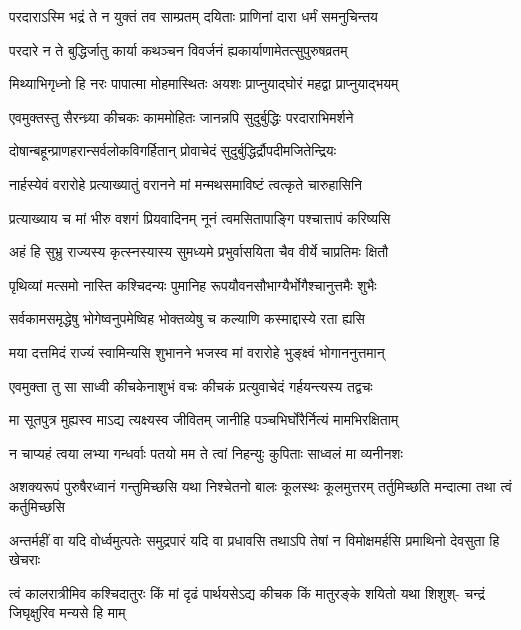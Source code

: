 \twolineshloka
{परदाराऽस्मि भद्रं ते न युक्तं तव साम्प्रतम्}
{दयिताः प्राणिनां दारा धर्मं समनुचिन्तय}


\twolineshloka
{परदारे न ते बुद्धिर्जातु कार्या कथञ्चन}
{विवर्जनं ह्यकार्याणामेतत्सुपुरुषव्रतम्}


\twolineshloka
{मिथ्याभिगृध्नो हि नरः पापात्मा मोहमास्थितः}
{अयशः प्राप्नुयाद्घोरं महद्वा प्राप्नुयाद्भयम्}



\twolineshloka
{एवमुक्तस्तु सैरन्ध्र्या कीचकः काममोहितः}
{जानन्नपि सुदुर्बुद्धिः परदाराभिमर्शने}


\twolineshloka
{दोषान्बहून्प्राणहरान्सर्वलोकविगर्हितान्}
{प्रोवाचेदं सुदुर्बुद्धिर्द्रौपदीमजितेन्द्रियः}


\twolineshloka
{नार्हस्येवं वरारोहे प्रत्याख्यातुं वरानने}
{मां मन्मथसमाविष्टं त्वत्कृते चारुहासिनि}


\twolineshloka
{प्रत्याख्याय च मां भीरु वशगं प्रियवादिनम्}
{नूनं त्वमसितापाङ्गि पश्चात्तापं करिष्यसि}


\twolineshloka
{अहं हि सुभ्रु राज्यस्य कृत्स्नस्यास्य सुमध्यमे}
{प्रभुर्वासयिता चैव वीर्ये चाप्रतिमः क्षितौ}


\twolineshloka
{पृथिव्यां मत्समो नास्ति कश्चिदन्यः पुमानिह}
{रूपयौवनसौभाग्यैर्भोगैश्चानुत्तमैः शुभैः}


\twolineshloka
{सर्वकामसमृद्धेषु भोगेष्वनुपमेष्विह}
{भोक्तव्येषु च कल्याणि कस्माद्दास्ये रता ह्यसि}


\twolineshloka
{मया दत्तमिदं राज्यं स्वामिन्यसि शुभानने}
{भजस्व मां वरारोहे भुङ्क्ष्वं भोगाननुत्तमान्}


\twolineshloka
{एवमुक्ता तु सा साध्वी कीचकेनाशुभं वचः}
{कीचकं प्रत्युवाचेदं गर्हयन्त्यस्य तद्वचः}




\twolineshloka
{मा सूतपुत्र मुह्यस्व माऽद्य त्यक्ष्यस्व जीवितम्}
{जानीहि पञ्चभिर्घोरैर्नित्यं मामभिरक्षिताम्}


\twolineshloka
{न चाप्यहं त्वया लभ्या गन्धर्वाः पतयो मम}
{ते त्वां निहन्युः कुपिताः साध्वलं मा व्यनीनशः}


\threelineshloka
{अशक्यरूपं पुरुषैरध्वानं गन्तुमिच्छसि}
{यथा निश्चेतनो बालः कूलस्थः कूलमुत्तरम्}
{तर्तुमिच्छति मन्दात्मा तथा त्वं कर्तुमिच्छसि}


\fourlineindentedshloka
{अन्तर्महीं वा यदि वोर्ध्वमुत्पतेः}
{समुद्रपारं यदि वा प्रधावसि}
{तथाऽपि तेषां न विमोक्षमर्हसि}
{प्रमाथिनो देवसुता हि खेचराः}


\fourlineindentedshloka
{त्वं कालरात्रीमिव कश्चिदातुरः}
{किं मां दृढं पार्थयसेऽद्य कीचक}
{किं मातुरङ्के शयितो यथा शिशुश्-}
{चन्द्रं जिघृक्षुरिव मन्यसे हि माम्}


